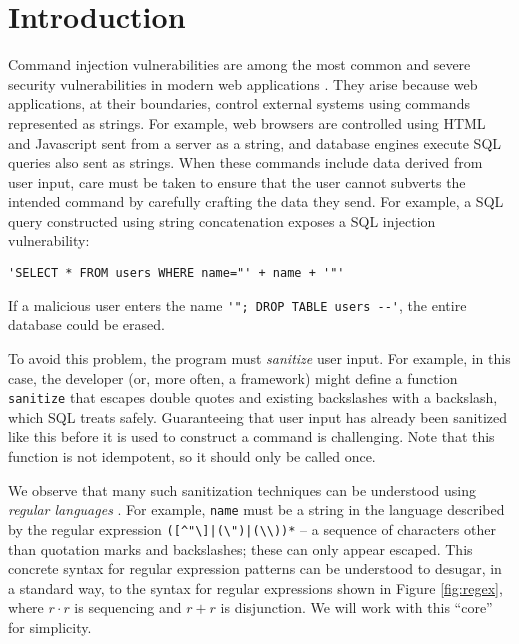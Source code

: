 \documentclass[9pt]{sig-alternate}
\theoremstyle{definition}
\begin{document}
\section{Introduction}\label{intro}
Command injection vulnerabilities are among the most common and severe security vulnerabilities in modern web applications \cite{OWASP}. They arise because web applications, at their boundaries, control external systems using commands represented as  strings. For example, web browsers are controlled using HTML and Javascript sent from a server as a string, and database engines execute SQL queries also sent as strings. When these commands include data derived from user input, care must be taken to ensure that the user cannot  subverts the intended command by carefully crafting the data they send. For example, a  SQL query constructed using string concatenation exposes a SQL injection vulnerability: 
\begin{lstlisting}[numbers=none]
'SELECT * FROM users WHERE name="' + name + '"'
\end{lstlisting}
If a malicious user enters the name \lstinline{'"; DROP TABLE users --'}, the entire database could be erased. 

To avoid this problem, the program must \emph{sanitize} user input. For example, in this case, the developer (or, more often, a framework) might define a function \verb|sanitize| that escapes double quotes and existing backslashes   with a backslash, which SQL treats safely. Guaranteeing that user input has already been sanitized like this before it is used to construct a command is challenging. Note that this function is not idempotent, so it should only be called once.

We observe that many such sanitization techniques can be understood using \emph{regular languages} \cite{cinderella}. For example, \verb|name| must be a string in the language described by the regular expression \verb!([^"\]|(\")|(\\))*! -- a sequence of characters other than quotation marks and backslashes; these can only appear escaped. This concrete syntax for regular expression patterns can be understood to desugar, in a standard way, to the syntax for regular expressions shown in Figure \ref{fig:regex}, where $r \cdot r$ is sequencing and $r + r$ is  disjunction. We will work with this ``core'' for simplicity.
\end{document}
